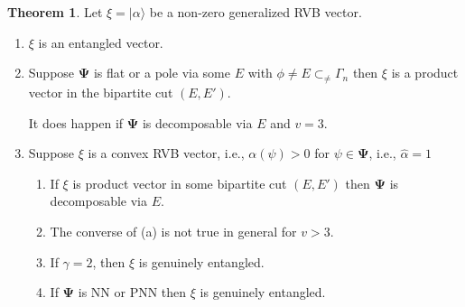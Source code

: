 \documentclass[a4paper,12pt]{article}
\theoremstyle{definition}
\theoremstyle{underlinethm}
\newtheorem{thm}{Theorem}[section]
\theoremstyle{definition}
\begin{document}
\begin{thm}\label{thm-4.1}
Let $\xi = | \alpha \rangle$ be a non-zero generalized RVB vector.
\begin{enumerate}[label= (\roman*)]
\item $\xi$ is an entangled vector.

\item Suppose $\boldsymbol{\Psi}$ is flat or a pole via some $E$ with $\phi \neq E \subset_{\neq} \Gamma_{n}$ then $\xi$ is a product vector in  the bipartite cut $(E, E')$.

It does happen if $\boldsymbol{\Psi}$ is decomposable via $E$ and $v=3$.

\item Suppose $\xi$ is a convex RVB vector, i.e., $\alpha(\psi) > 0$ for $\psi \in \boldsymbol{\Psi}$, i.e., $\hat{\alpha}=1$ 
\begin{enumerate}[label=(\alph*)]
\item If $\xi$ is product vector in some bipartite cut $(E, E')$ then $\boldsymbol{\Psi}$ is decomposable via $E$.

\item The converse of (a) is not true in general for $v > 3$.

\item If $\gamma = 2$, then $\xi$ is genuinely entangled.

\item If $\boldsymbol{\Psi}$ is NN or PNN then $\xi$ is genuinely entangled.
\end{enumerate}

 \end{enumerate}

\end{thm}
\end{document}
